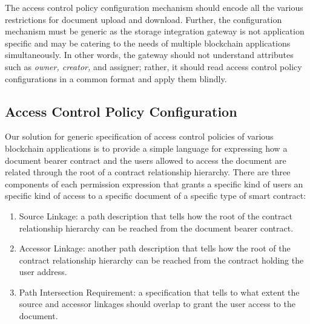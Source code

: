 The access control policy configuration mechanism should encode all the various restrictions for document upload and download. Further, the configuration mechanism must be generic as the storage integration gateway is not application specific and may be catering to the needs of multiple blockchain applications simultaneously. In other words, the gateway should not understand attributes such as {\it owner, creator,} and {assigner}; rather, it should read access control policy configurations in a common format and apply them blindly.      
 
\subsection{Access Control Policy Configuration}
Our solution for generic specification of access control policies of various blockchain applications is to provide a simple language for expressing how a document bearer contract and the users allowed to access the document are related through the root of a contract relationship hierarchy. There are three components of each permission expression that grants a specific kind of users an specific kind of access to a specific document of a specific type of smart contract:
\begin{enumerate}
\item Source Linkage: a path description that tells how the root of the contract relationship hierarchy can be reached from the document bearer contract.
\item Accessor Linkage: another path description that tells how the root of the contract relationship hierarchy can be reached from the contract holding the user address.
\item Path Intersection Requirement: a specification that tells to what extent the source and accessor linkages should overlap to grant the user access to the document.     
\end{enumerate}            
